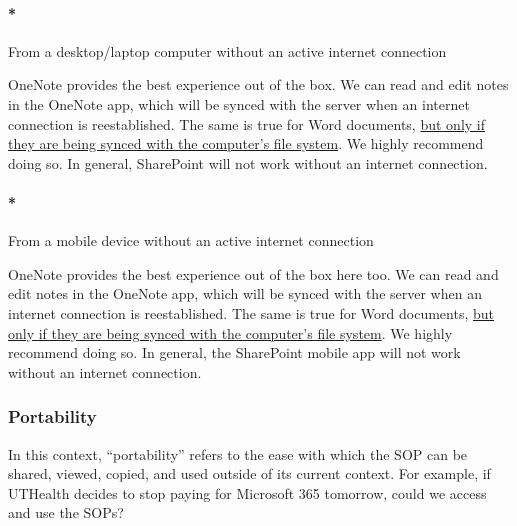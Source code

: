 \documentclass[
  letterpaper,
  DIV=11,
  numbers=noendperiod]{scrreprt}
\let\oldparagraph\paragraph
\renewcommand{\paragraph}[1]{\oldparagraph{#1}\mbox{}}
\begin{document}
\paragraph*{From a desktop/laptop computer without an active internet
connection}\label{from-a-desktoplaptop-computer-without-an-active-internet-connection}

OneNote provides the best experience out of the box. We can read and
edit notes in the OneNote app, which will be synced with the server when
an internet connection is reestablished. The same is true for Word
documents,
\href{https://support.microsoft.com/en-us/office/sync-sharepoint-files-with-the-onedrive-sync-client-groove-exe-59b1de2b-519e-4d3a-8f45-51647cf291cd}{but
only if they are being synced with the computer's file system}. We
highly recommend doing so. In general, SharePoint will not work without
an internet connection.

\paragraph*{From a mobile device without an active internet
connection}\label{from-a-mobile-device-without-an-active-internet-connection}

OneNote provides the best experience out of the box here too. We can
read and edit notes in the OneNote app, which will be synced with the
server when an internet connection is reestablished. The same is true
for Word documents,
\href{https://support.microsoft.com/en-us/office/sync-sharepoint-files-with-the-onedrive-sync-client-groove-exe-59b1de2b-519e-4d3a-8f45-51647cf291cd}{but
only if they are being synced with the computer's file system}. We
highly recommend doing so. In general, the SharePoint mobile app will
not work without an internet connection.

\subsubsection*{Portability}\label{portability}

In this context, ``portability'' refers to the ease with which the SOP
can be shared, viewed, copied, and used outside of its current context.
For example, if UTHealth decides to stop paying for Microsoft 365
tomorrow, could we access and use the SOPs?
\end{document}
